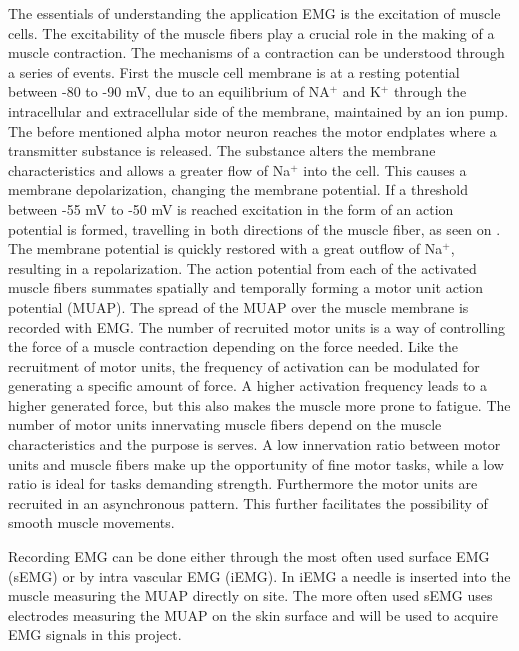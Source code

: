 The essentials of understanding the application EMG is the excitation of muscle cells. The excitability of the muscle fibers play a crucial role in the making of a muscle contraction. The mechanisms of a contraction can be understood through a series of events. First the muscle cell membrane is at a resting potential between -80 to -90 mV, due to an equilibrium of NA$^+$ and K$^+$ through the intracellular and extracellular side of the membrane, maintained by an ion pump. The before mentioned alpha motor neuron reaches the motor endplates where a transmitter substance is released. The substance alters the membrane characteristics and allows a greater flow of Na$^+$ into the cell. This causes a membrane depolarization, changing the membrane potential. If a threshold between -55 mV to -50 mV is reached excitation in the form of an action potential is formed, travelling in both directions of the muscle fiber, as seen on . The membrane potential is quickly restored with a great outflow of Na$^+$, resulting in a repolarization. The action potential from each of the activated muscle fibers summates spatially and temporally forming a motor unit action potential (MUAP). The spread of the MUAP over the muscle membrane is recorded with EMG. The number of recruited motor units is a way of controlling the force of a muscle contraction depending on the force needed. Like the recruitment of motor units, the frequency of activation can be modulated for generating a specific amount of force. A higher activation frequency leads to a higher generated force, but this also makes the muscle more prone to fatigue. The number of motor units innervating muscle fibers depend on the muscle characteristics and the purpose is serves. A low innervation ratio between motor units and muscle fibers make up the opportunity of fine motor tasks, while a low ratio is ideal for tasks demanding strength. Furthermore the motor units are recruited in an asynchronous pattern. This further facilitates the possibility of smooth muscle movements. \cite{Martini2012, Cram2012}       

Recording EMG can be done either through the most often used surface EMG (sEMG) or by intra vascular EMG (iEMG). In iEMG a needle is inserted into the muscle measuring the MUAP directly on site. The more often used sEMG uses electrodes measuring the MUAP on the skin surface and will be used to acquire EMG signals in this project. \cite{Cram2012} 
